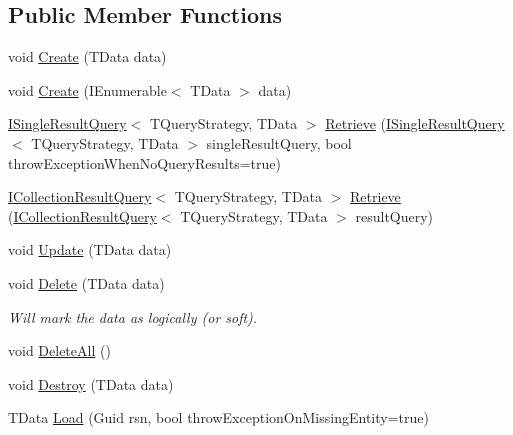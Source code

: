 \subsection*{Public Member Functions}
\begin{DoxyCompactItemize}
\item 
void \hyperlink{interfaceCqrs_1_1Repositories_1_1IRepository_a240c8d094207a22b0c805a5c830d8615}{Create} (T\+Data data)
\item 
void \hyperlink{interfaceCqrs_1_1Repositories_1_1IRepository_ae3481fb2ecb0146308e07a9dd6af8c14}{Create} (I\+Enumerable$<$ T\+Data $>$ data)
\item 
\hyperlink{interfaceCqrs_1_1Repositories_1_1Queries_1_1ISingleResultQuery}{I\+Single\+Result\+Query}$<$ T\+Query\+Strategy, T\+Data $>$ \hyperlink{interfaceCqrs_1_1Repositories_1_1IRepository_a65848508067b81e82da72af2063f2c07}{Retrieve} (\hyperlink{interfaceCqrs_1_1Repositories_1_1Queries_1_1ISingleResultQuery}{I\+Single\+Result\+Query}$<$ T\+Query\+Strategy, T\+Data $>$ single\+Result\+Query, bool throw\+Exception\+When\+No\+Query\+Results=true)
\item 
\hyperlink{interfaceCqrs_1_1Repositories_1_1Queries_1_1ICollectionResultQuery}{I\+Collection\+Result\+Query}$<$ T\+Query\+Strategy, T\+Data $>$ \hyperlink{interfaceCqrs_1_1Repositories_1_1IRepository_a0faeb50aa395d63ccd81e66906360e81}{Retrieve} (\hyperlink{interfaceCqrs_1_1Repositories_1_1Queries_1_1ICollectionResultQuery}{I\+Collection\+Result\+Query}$<$ T\+Query\+Strategy, T\+Data $>$ result\+Query)
\item 
void \hyperlink{interfaceCqrs_1_1Repositories_1_1IRepository_af8a0b1cf5eedd7653d2867ab38657d46}{Update} (T\+Data data)
\item 
void \hyperlink{interfaceCqrs_1_1Repositories_1_1IRepository_a71c60de3588a757da2d25350c98374fd}{Delete} (T\+Data data)
\begin{DoxyCompactList}\small\item\em Will mark the {\itshape data}  as logically (or soft). \end{DoxyCompactList}\item 
void \hyperlink{interfaceCqrs_1_1Repositories_1_1IRepository_a0da5f756a0fd184dc51a81741f82734a}{Delete\+All} ()
\item 
void \hyperlink{interfaceCqrs_1_1Repositories_1_1IRepository_a3a7a60be19498813b3822558b88fad66}{Destroy} (T\+Data data)
\item 
T\+Data \hyperlink{interfaceCqrs_1_1Repositories_1_1IRepository_ae545451c48d1e2b5693db73e169e100d}{Load} (Guid rsn, bool throw\+Exception\+On\+Missing\+Entity=true)
\end{DoxyCompactItemize}



